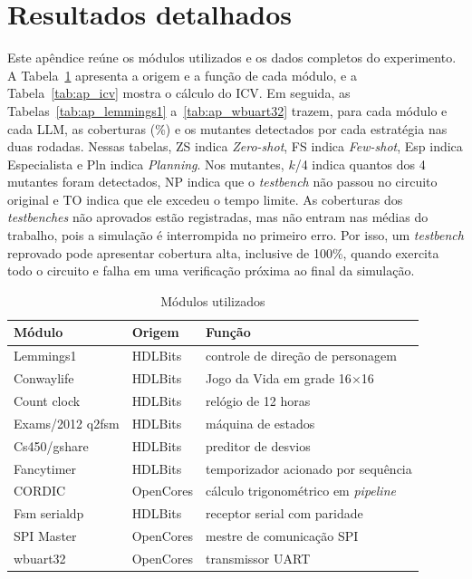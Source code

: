 
\section{Resultados detalhados}
\label{ap:resultados}

Este apêndice reúne os módulos utilizados e os dados completos do experimento. A Tabela~\ref{tab:modulos} apresenta a origem e a função de cada módulo, e a Tabela~\ref{tab:ap_icv} mostra o cálculo do ICV. Em seguida, as Tabelas~\ref{tab:ap_lemmings1} a~\ref{tab:ap_wbuart32} trazem, para cada módulo e cada LLM, as coberturas (\%) e os mutantes detectados por cada estratégia nas duas rodadas. Nessas tabelas, ZS indica \textit{Zero-shot}, FS indica \textit{Few-shot}, Esp indica Especialista e Pln indica \textit{Planning}. Nos mutantes, $k$/4 indica quantos dos 4 mutantes foram detectados, NP indica que o \textit{testbench} não passou no circuito original e TO indica que ele excedeu o tempo limite. As coberturas dos \textit{testbenches} não aprovados estão registradas, mas não entram nas médias do trabalho, pois a simulação é interrompida no primeiro erro. Por isso, um \textit{testbench} reprovado pode apresentar cobertura alta, inclusive de 100\%, quando exercita todo o circuito e falha em uma verificação próxima ao final da simulação.

\begin{table}[htbp]
  \centering
  \caption{Módulos utilizados}
  \label{tab:modulos}
  \footnotesize
  \begin{tabular}{@{}lll@{}}
    \toprule
    Módulo & Origem & Função \\
    \midrule
    Lemmings1 & HDLBits & controle de direção de personagem \\
    Conwaylife & HDLBits & Jogo da Vida em grade 16$\times$16 \\
    Count clock & HDLBits & relógio de 12 horas \\
    Exams/2012 q2fsm & HDLBits & máquina de estados \\
    Cs450/gshare & HDLBits & preditor de desvios \\
    Fancytimer & HDLBits & temporizador acionado por sequência \\
    CORDIC & OpenCores & cálculo trigonométrico em \textit{pipeline} \\
    Fsm serialdp & HDLBits & receptor serial com paridade \\
    SPI Master & OpenCores & mestre de comunicação SPI \\
    wbuart32 & OpenCores & transmissor UART \\
    \bottomrule
  \end{tabular}
\end{table}

